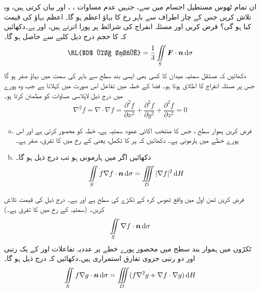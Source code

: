 \quad
ان تمام ٹھوس   مستطیل اجسام  میں سے،  جنہیں عدم مساوات ،  ، اور  بیان کرتی ہیں، وہ تلاش کریں جس کے چار اطراف سے باہر رخ  کا بہاؤ اعظم ہو گا۔ اعظم بہاؤ کی قیمت کیا ہو گی؟
\quad
فرض کریں  اور  مسئلہ انفراج کی شرائط پر پورا اترتے ہیں، اور  ہے۔دکھائیں کہ  کا حجم درج ذیل  کلیے سے حاصل ہو گا۔
\[\text{\RL{$D$ کا حجم}}=\frac{1}{3}\iint\limits_S\kvec{F}\cdot\an\dif\sigma\]
\quad
دکھائیں کہ مستقل سمتیہ میدان  کا  کسی بھی  ایسی بند سطح سے باہر کی سمت میں   بہاؤ صفر ہو گا   جس پر مسئلہ انفراج کا اطلاق ہوتا ہو۔
\quad
فضا کے خطہ   میں تفاعل  اس صورت میں  کہلاتا ہے  جب وہ پورے  میں درج ذیل  لاپلاسی مساوات کو مطمئن کرتا ہو۔
\[\nabla^2f=\nabla\cdot\nabla f=\frac{\partial^2f}{\partial x^2}+\frac{\partial^2f}{\partial y^2}+\frac{\partial^2f}{\partial z^2}=0\]
\begin{enumerate}[a.]
\item
فرض کریں ہموار سطح     ، جس کا منتخب اکائی عمود سمتیہ  ہے،  خطہ   کو  محصور کرتی ہے اور  
اس  پورے خطے میں ہارمونی ہے۔ دکھائیں کہ  پر  کا تکمل،  یعنی  کے رخ میں    کا تفرق، صفر ہے۔
\item
دکھائیں اگر  میں  ہارمونی ہو تب درج ذیل ہو گا۔
\[\iint\limits_Sf\nabla f\cdot \an\dif\sigma=\iiint\limits_D|\nabla f|^2\dif H\]
\end{enumerate}
 \quad
فرض کریں ثمن اول میں واقع ٹھوس   کرہ  کے ٹکڑے کی سطح  ہے اور  ہے۔ درج ذیل کی قیمت تلاش کریں۔ (سمتیہ  کے رخ  میں  کا تفرق  ہے۔)
\[\iint\limits_S \nabla f\cdot\an\dif\sigma\]
\quad
ٹکڑوں میں ہموار بند  سطح  میں محصور   پورے خطے   پر عددیہ تفاعلات  اور   کے یک رتبی اور  دو رتبی جزوی تفارق  استمراری ہیں۔دکھائیں کہ درج ذیل ہو گا۔
\begin{align}\label{مساوات_سمتی_میدان_گرین_کلیہ_اول}
\iint\limits_S f\nabla g\cdot \an\dif\sigma=\iiint\limits_D (f\nabla^2g+\nabla f\cdot \nabla g)\dif H
\end{align}
